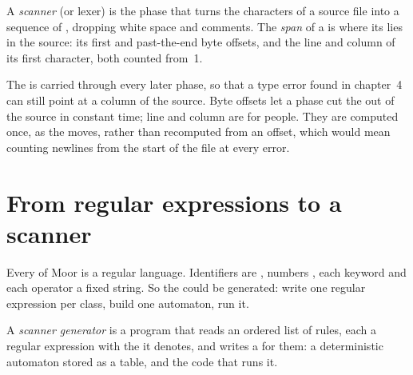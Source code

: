 \label{lst:b3:lexical-analysis:token}

\begin{definition}\label{def:b3:lexical-analysis:scanner}
A \emph{scanner} (or lexer) is the phase that turns the characters of a source file into a sequence of , dropping white space and comments. The \emph{span} of a  is where its  lies in the source: its first and past-the-end byte offsets, and the line and column of its first character, both counted from~1.
\end{definition}

The  is carried through every later phase, so that a type error found in chapter~4 can still point at a column of the source. Byte offsets let a phase cut the  out of the source in constant time; line and column are for people. They are computed once, as the  moves, rather than recomputed from an offset, which would mean counting newlines from the start of the file at every error.

\section{From regular expressions to a scanner}\label{sec:b3:lexical-analysis:regex}

Every  of Moor is a regular language. Identifiers are \code{[A-Za-z_][A-Za-z0-9_]*}, numbers \code{[0-9]+}, each keyword and each operator a fixed string. So the  could be generated: write one regular expression per class, build one automaton, run it.

\begin{definition}\label{def:b3:lexical-analysis:generator}
A \emph{scanner generator} is a program that reads an ordered list of rules, each a regular expression with the  it denotes, and writes a  for them: a deterministic automaton stored as a table, and the code that runs it.
\end{definition}


